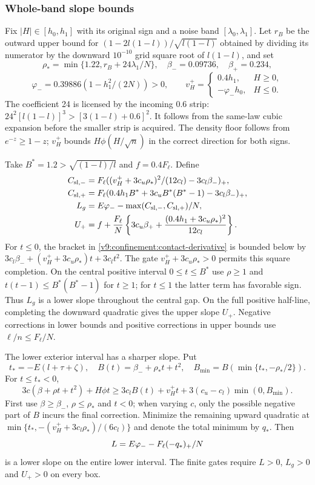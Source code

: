 \subsubsection{Whole-band slope bounds}
\label{v9:confinement:slopes}
Fix $|H|\in[h_0,h_1]$ with its original sign and a noise band
$[\lambda_0,\lambda_1]$. Let $r_B$ be the outward upper bound for
$(1-2l(1-l))/\sqrt{l(1-l)}$ obtained by dividing its numerator by the downward $10^{-10}$ grid
square root of $l(1-l)$, and set
\[
 \rho_*=\min\{1.22,r_B+24\lambda_1/N\},\quad
 \beta_-=0.09736,\quad\beta_+=0.234,
\]
\[
 \varphi_-=0.39886(1-h_1^2/(2N))>0,\qquad
 v_H^+=\begin{cases}0.4h_1,&H\ge0,\\-\varphi_-h_0,&H\le0.\end{cases}
\]
The coefficient 24 is licensed by the incoming $0.6$ strip:
$24^2[l(1-l)]^3>[3(1-l)+0.6]^2$. It follows from the same-law
cubic expansion before the smaller strip is acquired. The density
floor follows from $e^{-z}\ge1-z$; $v_H^+$ bounds $H\phi(H/\sqrt n)$
in the correct direction for both signs.

Take $B^*=1.2>\sqrt{(1-l)/l}$ and $f=0.4F_\ell$. Define
\begin{align*}
 C_{{\rm sl},-}&=F_\ell((v_H^++3c_u\rho_*)^2/(12c_l)-3c_l\beta_-)_+,\\
 C_{{\rm sl},+}&=F_\ell(0.4h_1B^*+3c_uB^*(B^*-1)-3c_l\beta_-)_+,\\
 L_g&=E\varphi_--\max(C_{{\rm sl},-},C_{{\rm sl},+})/N,\\
 U_+&=f+\frac{F_\ell}{N}
       \left\{3c_u\beta_++\frac{(0.4h_1+3c_u\rho_*)^2}{12c_l}\right\}.
\end{align*}
For $t\le0$, the bracket in \eqref{v9:confinement:contact-derivative}
is bounded below by
$3c_l\beta_-+(v_H^++3c_u\rho_*)t+3c_lt^2$.
The gate $v_H^++3c_u\rho_*>0$ permits this square completion.
On the central positive interval $0\le t\le B^*$ use $\rho\ge1$ and
$t(t-1)\le B^*(B^*-1)$ for $t\ge1$; for $t\le1$ the latter term
has favorable sign. Thus $L_g$ is a lower slope throughout the central
gap. On the full positive half-line, completing the downward quadratic
gives the upper slope $U_+$. Negative corrections in lower bounds and
positive corrections in upper bounds use $\ell/n\le F_\ell/N$.

The lower exterior interval has a sharper slope. Put
\[
 t_*=-E(l+\tau+\zeta),\quad B(t)=\beta_-+\rho_*t+t^2,\quad
 B_{\min}=B(\min\{t_*,-\rho_*/2\}).
\]
For $t\le t_*<0$,
\[
 3c(\beta+\rho t+t^2)+H\phi t
 \ge3c_lB(t)+v_H^+t+3(c_u-c_l)\min(0,B_{\min}).
\]
First use $\beta\ge\beta_-$, $\rho\le\rho_*$ and $t<0$; when varying
$c$, only the possible negative part of $B$ incurs the final correction.
Minimize the remaining upward quadratic at
$\min\{t_*,-(v_H^++3c_l\rho_*)/(6c_l)\}$ and denote the total minimum
by $q_*$. Then
\[
 L=E\varphi_--F_\ell(-q_*)_+/N
\]
is a lower slope on the entire lower interval. The finite gates require
$L>0$, $L_g>0$ and $U_+>0$ on every box.

